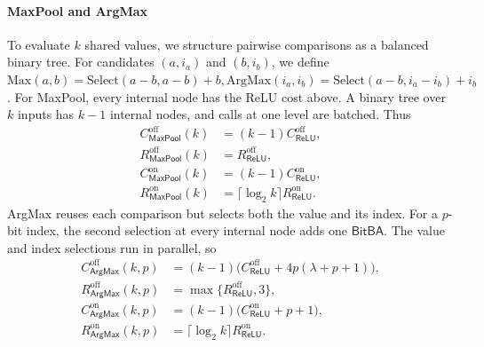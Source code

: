 \documentclass[journal]{IEEEtran}
\theoremstyle{definition}
\theoremstyle{plain}
\newcommand{\ReLU}{\mathsf{ReLU}}
\newcommand{\BitBA}{\mathsf{BitBA}}
\begin{document}
\paragraph*{MaxPool and ArgMax}
To evaluate $k$ shared values, we structure
pairwise comparisons as a balanced binary tree.
For candidates $(a, i_a)$ and $(b, i_b)$, we define
$\text{Max}(a, b) = \text{Select}(a - b, a - b) + b,
\text{ArgMax}(i_a, i_b) = \text{Select}(a - b, i_a - i_b) + i_b$.
For MaxPool, every internal node has the ReLU cost above. A binary tree over
$k$ inputs has $k-1$ internal nodes, and calls at one level are batched. Thus
\begin{equation}
\begin{aligned}
C^{\mathrm{off}}_{\mathsf{MaxPool}}(k)&=(k-1)C^{\mathrm{off}}_{\ReLU},\\
R^{\mathrm{off}}_{\mathsf{MaxPool}}(k)&=R^{\mathrm{off}}_{\ReLU},\\
C^{\mathrm{on}}_{\mathsf{MaxPool}}(k)&=(k-1)C^{\mathrm{on}}_{\ReLU},\\
R^{\mathrm{on}}_{\mathsf{MaxPool}}(k)
 &=\lceil\log_2 k\rceil R^{\mathrm{on}}_{\ReLU}.
\end{aligned}
\label{eq:maxpool-cost}
\end{equation}
ArgMax reuses each comparison but selects both the value and its index. For a
$p$-bit index, the second selection at every internal node adds one $\BitBA$.
The value and index selections run in parallel, so
\begin{equation}
\begin{aligned}
C^{\mathrm{off}}_{\mathsf{ArgMax}}(k,p)
 &=(k-1)\bigl(C^{\mathrm{off}}_{\ReLU}
       +4p(\lambda+p+1)\bigr),\\
R^{\mathrm{off}}_{\mathsf{ArgMax}}(k,p)
 &=\max\{R^{\mathrm{off}}_{\ReLU},3\},\\
C^{\mathrm{on}}_{\mathsf{ArgMax}}(k,p)
 &=(k-1)\bigl(C^{\mathrm{on}}_{\ReLU}+p+1\bigr),\\
R^{\mathrm{on}}_{\mathsf{ArgMax}}(k,p)
 &=\lceil\log_2 k\rceil R^{\mathrm{on}}_{\ReLU}.
\end{aligned}
\label{eq:argmax-cost}
\end{equation}
\end{document}
